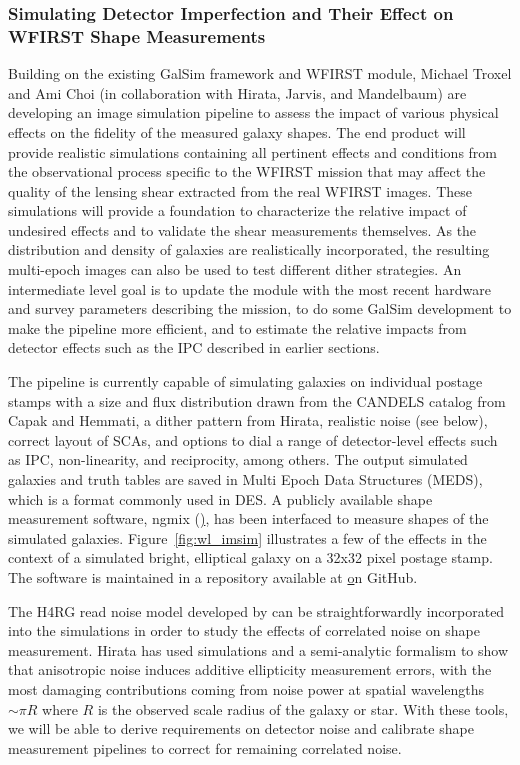 \subsubsection{Simulating Detector Imperfection and Their Effect on WFIRST Shape Measurements}
\label{sec:hlis_image_sim}
Building on the existing GalSim framework and WFIRST module, Michael Troxel and Ami Choi (in collaboration with Hirata, Jarvis, and Mandelbaum) are developing an image
simulation pipeline to assess the impact of various physical effects on the fidelity of the measured galaxy shapes.  The end product will provide realistic simulations containing all pertinent effects and conditions from the observational process specific to the WFIRST mission that may affect the quality of the lensing shear extracted
from the real WFIRST images.  These simulations will provide a foundation to characterize the relative impact of undesired effects and to validate the shear measurements themselves.  As the distribution and density of galaxies are realistically incorporated, the resulting multi-epoch images can also be used to test different dither strategies.  An intermediate level goal is to update the module with the most recent hardware and survey parameters describing the mission, to do some GalSim development to make the pipeline more efficient, and to estimate the relative impacts from detector effects such as the IPC described in earlier sections.

The pipeline is currently capable of simulating galaxies on individual postage stamps with a size and flux distribution drawn from the CANDELS catalog from Capak and Hemmati, a dither pattern from Hirata, realistic noise (see below), correct layout of SCAs, and options to dial a range of detector-level effects such as IPC, non-linearity, and reciprocity, among others.  The output simulated galaxies and truth tables are saved in Multi Epoch Data Structures (MEDS), which is a format commonly used in DES.  A publicly available shape measurement software, ngmix (\href{https://github.com/esheldon/ngmix/}), has been interfaced to measure shapes of the simulated galaxies.  Figure~\ref{fig:wl_imsim} illustrates a few of the effects in the context of a simulated bright, elliptical galaxy on a 32x32 pixel postage stamp.  The software is maintained in a repository available at \href{https://github.com/matroxel/wfirst_imsim} on GitHub.

The H4RG read noise model developed by \cite{Rauscher2015} can be straightforwardly incorporated into the simulations in order to study the effects of correlated noise on shape measurement.  Hirata has used simulations and a semi-analytic formalism to show that anisotropic noise induces additive ellipticity measurement errors, with the most damaging contributions coming from noise power at spatial wavelengths $\sim\pi R$ where $R$ is the observed scale radius of the galaxy or star.  With these tools, we will be able to derive requirements on detector noise and calibrate shape measurement pipelines to correct for remaining correlated noise.

